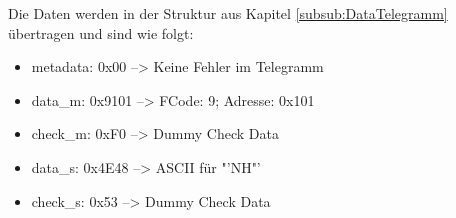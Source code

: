 Die Daten werden in der Struktur aus Kapitel \ref{subsub:DataTelegramm} übertragen und sind wie folgt:

\begin{itemize}[noitemsep]
    \item metadata: 0x00 --> Keine Fehler im Telegramm
    \item data\_m: 0x9101 --> FCode: 9; Adresse: 0x101
    \item check\_m: 0xF0 --> Dummy Check Data
    \item data\_s: 0x4E48 --> ASCII für "'NH"'
    \item check\_s: 0x53 --> Dummy Check Data
\end{itemize}


